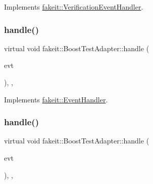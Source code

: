 Implements \mbox{\hyperlink{structfakeit_1_1VerificationEventHandler_a826b9d15e23bad7013b219d8e45ef1d0}{fakeit\+::\+Verification\+Event\+Handler}}.

\mbox{\label{structfakeit_1_1BoostTestAdapter_a8c5e79f154223dce9fa9cbabd1bb3242}} 
\subsubsection{\texorpdfstring{handle()}{handle()}\hspace{0.1cm}{\footnotesize\ttfamily [4/6]}}
{\footnotesize\ttfamily virtual void fakeit\+::\+Boost\+Test\+Adapter\+::handle (\begin{DoxyParamCaption}\item[{const \mbox{\hyperlink{structfakeit_1_1UnexpectedMethodCallEvent}{Unexpected\+Method\+Call\+Event}} \&}]{evt }\end{DoxyParamCaption})\hspace{0.3cm}{\ttfamily [inline]}, {\ttfamily [override]}, {\ttfamily [virtual]}}



Implements \mbox{\hyperlink{structfakeit_1_1EventHandler_a4de5ad05e5de73e36f4b2cede6d8efd3}{fakeit\+::\+Event\+Handler}}.

\mbox{\label{structfakeit_1_1BoostTestAdapter_a8ba1497e33a41a7927668860f56295b6}} 
\subsubsection{\texorpdfstring{handle()}{handle()}\hspace{0.1cm}{\footnotesize\ttfamily [5/6]}}
{\footnotesize\ttfamily virtual void fakeit\+::\+Boost\+Test\+Adapter\+::handle (\begin{DoxyParamCaption}\item[{const \mbox{\hyperlink{structfakeit_1_1SequenceVerificationEvent}{Sequence\+Verification\+Event}} \&}]{evt }\end{DoxyParamCaption})\hspace{0.3cm}{\ttfamily [inline]}, {\ttfamily [override]}, {\ttfamily [virtual]}}



